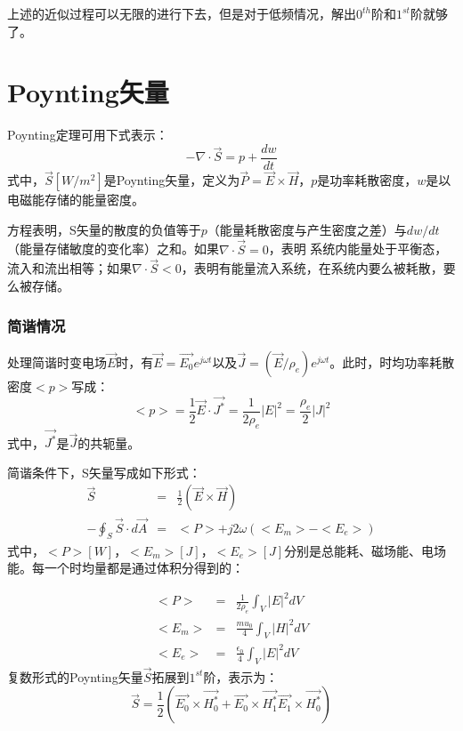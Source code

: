 上述的近似过程可以无限的进行下去，但是对于低频情况，解出$0^{th}$阶和$1^{st}$阶就够了。

\section{Poynting矢量}
Poynting定理可用下式表示：
\begin{equation}\label{eqn:poynting}
-\nabla\cdot \vec{S}=p+\frac{dw}{dt}
\end{equation}
式中，$\vec{S}[W/m^2]$是Poynting矢量，定义为$\vec{P}=\vec{E}\times \vec{H}$，$p$是功率耗散密度，$w$是以电磁能存储的能量密度。

方程表明，S矢量的散度的负值等于$p$（能量耗散密度与产生密度之差）与$dw/dt$（能量存储敏度的变化率）之和。如果$\nabla \cdot \vec{S}=0$，表明
系统内能量处于平衡态，流入和流出相等；如果$\nabla \cdot \vec{S}<0$，表明有能量流入系统，在系统内要么被耗散，要么被存储。

\subsubsection{简谐情况}
处理简谐时变电场$\vec{E}$时，有$\vec{E}=\vec{E_0}e^{j\omega t}$以及$\vec{J}=(\vec{E}/\rho_e)e^{j\omega t}$。此时，时均功率耗散密度$<p>$写成：
\begin{equation}\label{eqn:poynting sincase}
  <p>=\frac{1}{2}\vec{E}\cdot \vec{J^*}=\frac{1}{2\rho_e}|E|^2=\frac{\rho_e}{2}|J|^2
\end{equation}
式中，$\vec{J^*}$是$\vec{J}$的共轭量。

简谐条件下，S矢量写成如下形式：
\begin{eqnarray}\label{eqn:poynting s-vector sin}
\vec{S}&=&\frac{1}{2}(\vec{E}\times \vec{H}) \nonumber \\
-\oint_S \vec{S}\cdot d\vec{A}&=&<P>+j2\omega (<E_m>-<E_e>)
\end{eqnarray}
式中，$<P>[W]$，$<E_m>[J]$，$<E_e>[J]$分别是总能耗、磁场能、电场能。每一个时均量都是通过体积分得到的：

\begin{eqnarray}\label{eqn:poynting power sin}
<P>&=& \frac{1}{2\rho_e}\int_V|E|^2dV\nonumber \\
<E_m>&=& \frac{mu_0}{4}\int_V|H|^2dV\nonumber \\
<E_e>&=& \frac{\epsilon_0}{4}\int_V|E|^2dV
\end{eqnarray}
复数形式的Poynting矢量$\vec{S}$拓展到$1^{st}$阶，表示为：
\begin{equation}\label{eqn:1st poynting}
\vec{S}=\frac{1}{2}(\vec{E_0}\times \vec{H_0^*}+\vec{E_0}\times \vec{H_1^*}\vec{E_1}\times \vec{H_0^*})
\end{equation}

